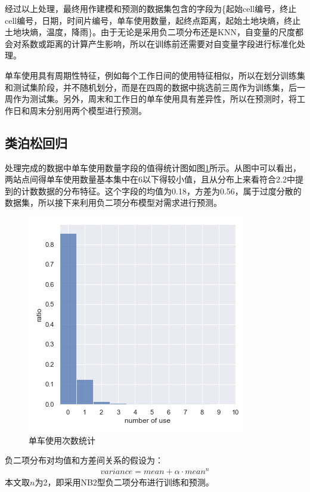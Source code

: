\documentclass[]{tongjithesis}
\numberwithin{equation}{chapter}
\begin{document}
经过以上处理，最终用作建模和预测的数据集包含的字段为\{起始cell编号，终止cell编号，日期，时间片编号，单车使用数量，起终点距离，起始土地块熵，终止土地块熵，温度，降雨\}。由于无论是采用负二项分布还是KNN，自变量的尺度都会对系数或距离的计算产生影响，所以在训练前还需要对自变量字段进行标准化处理。

单车使用具有周期性特征，例如每个工作日间的使用特征相似，所以在划分训练集和测试集阶段，并不随机划分，而是在四周的数据中挑选前三周作为训练集，后一周作为测试集。另外，周末和工作日的单车使用具有差异性，所以在预测时，将工作日和周末分别用两个模型进行预测。

\subsection{类泊松回归}
处理完成的数据中单车使用数量字段的值得统计图如图\ref{usecount}所示。从图中可以看出，两站点间得单车使用数量基本集中在6以下得较小值，且从分布上来看符合2.2中提到的计数数据的分布特征。这个字段的均值为0.18，方差为0.56，属于过度分散的数据集，所以接下来利用负二项分布模型对需求进行预测。
\begin{figure}[H]
	\centering
	\includegraphics[width= 0.5 \textwidth]{figures_main/counthist.png}
	\caption{单车使用次数统计}
	\label{usecount}
\end{figure}

负二项分布对均值和方差间关系的假设为：
\begin{align}
variance = mean + \alpha \cdot mean^{n}
\end{align}
本文取$n$为2，即采用NB2型负二项分布进行训练和预测。
\end{document}

